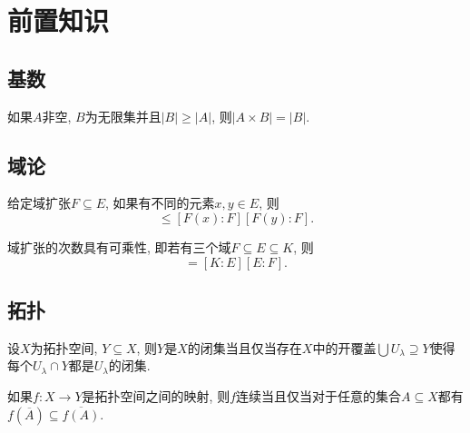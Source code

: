
\section{前置知识}

\subsection{基数}

\begin{propositionnoproof}\label{prop:cardcartcor}
  如果$A$非空, $B$为无限集并且$\vert B\vert\geq \vert A\vert$, 则$\vert A\times B\vert=\vert B\vert$.
\end{propositionnoproof}

\subsection{域论}

\begin{propositionnoproof}\label{thm:fntfieldextdegree}
  给定域扩张$F\subseteq E$, 如果有不同的元素$x, y\in E$, 则
  \begin{equation*}
    [F(x, y){:}F]\leq [F(x):F][F(y):F].
  \end{equation*}
\end{propositionnoproof}

\begin{theoremnoproof}\label{thm:fieldextdegreemulti}
  域扩张的次数具有可乘性, 即若有三个域$F\subseteq E\subseteq K$, 则
  \begin{equation*}
    [K:F]=[K:E][E:F].
  \end{equation*}
\end{theoremnoproof}

\subsection{拓扑}

\begin{propositionnoproof}\label{prop:closedsetlocal}
  设$X$为拓扑空间, $Y\subseteq X$, 则$Y$是$X$的闭集当且仅当存在$X$中的开覆盖$\bigcup U_\lambda\supseteq Y$使得每个$U_\lambda\cap Y$都是$U_\lambda$的闭集.
\end{propositionnoproof}

\begin{propositionnoproof}\label{prop:continuousimageclosure}
  如果$f\colon X\to Y$是拓扑空间之间的映射, 则$f$连续当且仅当对于任意的集合$A\subseteq X$都有$f(\overline{A})\subseteq\overline{f(A)}$.
\end{propositionnoproof}

